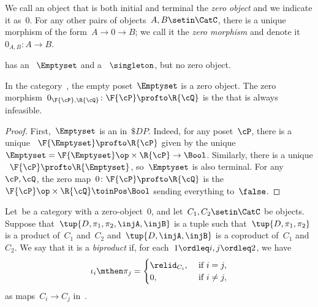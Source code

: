 \begin{ctdefinition}
    \label{def:zero-object}
    We call an object that is both initial and terminal the \emph{zero object} and we indicate it as~$0$.
    For any other pairs of objects~$A, B\setin\CatC$, there is a unique morphism of the form~$A \to 0\to B$; we call it the \emph{zero morphism} and denote it~$0_{A,B}\colon A \to B$.
\end{ctdefinition}

\begin{example}
    \Pos has an ~$\Emptyset$ and a ~$\singleton$, but no zero object.
\end{example}

\begin{lemma}
    In the category~\DP, the empty poset~$\Emptyset$ is a zero object.
    The zero morphism~$0_{\F{\cP},\R{\cQ}}\colon \F{\cP} \profto \R{\cQ}$ is the  that is always infeasible.
\end{lemma}
\begin{proof}
    First,~$\Emptyset$ is an  in~$\$DP$.
    Indeed, for any poset~$\cP $, there is a unique ~$\F{\Emptyset} \profto \R{\cP}$ given by the unique ~$\Emptyset=\F{\Emptyset}\op\times \R{\cP} \to\Bool$.
    Similarly, there is a unique ~$\F{\cP} \profto \R{\Emptyset}$, so~$\Emptyset$ is also terminal.
    For any ~$\cP,\cQ$, the zero map~$0 \colon \F{\cP} \profto \R{\cQ}$ is the ~$\F{\cP} \op\times \R{\cQ} \toinPos \Bool$ sending everything to~$\false$.
\end{proof}

\begin{ctdefinition}[Biproduct]
    \label{def:biproduct}
    Let~\CatC be a category with a zero-object~$0$, and let~$C_1,C_2\setin\CatC$ be objects.
    Suppose that~$\tup{D,\pi_1,\pi_2,\injA,\injB}$ is a tuple such that~$\tup{D,\pi_1,\pi_2}$ is a product of~$C_1$ and~$C_2$ and~$\tup{D,\injA,\injB}$ is a coproduct of~$C_1$ and~$C_2$.
    We say that it is a \emph{biproduct} if, for each~$1\ordleq i,j\ordleq 2$, we have
    \begin{equation}
        \iota_i\mthen \pi_j=
        \begin{cases}
            \relid_{C_i}, & \text{ if }i=j,     \\
            0,            & \text{ if }i\neq j,
        \end{cases} \label{eq:biproduct-condition}
    \end{equation}
    as maps~$C_i\to C_j$ in~\CatC.
\end{ctdefinition}

